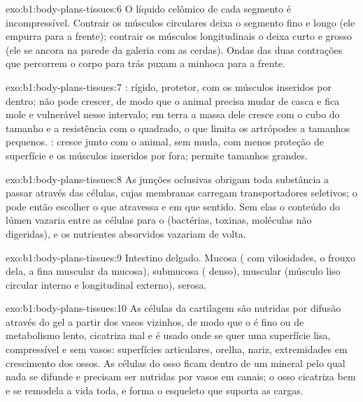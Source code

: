 \begin{solution}{exo:b1:body-plans-tissues:6}
O líquido celômico de cada segmento é incompressível. Contrair os
músculos circulares deixa o segmento fino e longo (ele empurra para a
frente); contrair os músculos longitudinais o deixa curto e grosso (ele
se ancora na parede da galeria com as cerdas). Ondas das duas contrações
que percorrem o corpo para trás puxam a minhoca para a frente.
\end{solution}

\begin{solution}{exo:b1:body-plans-tissues:7}
: rígido, protetor, com os músculos inseridos por dentro;
não pode crescer, de modo que o animal precisa mudar de casca e fica
mole e vulnerável nesse intervalo; em terra a massa dele cresce com o
cubo do tamanho e a resistência com o quadrado, o que limita os
artrópodes a tamanhos pequenos. : cresce junto com o
animal, sem muda, com menos proteção de superfície e os músculos
inseridos por fora; permite tamanhos grandes.
\end{solution}

\begin{solution}{exo:b1:body-plans-tissues:8}
As junções oclusivas obrigam toda substância a passar através das
células, cujas membranas carregam transportadores seletivos; o 
pode então escolher o que atravessa e em que sentido. Sem elas o
conteúdo do lúmen vazaria entre as células para o 
(bactérias, toxinas, moléculas não digeridas), e os nutrientes
absorvidos vazariam de volta.
\end{solution}

\begin{solution}{exo:b1:body-plans-tissues:9}
Intestino delgado. Mucosa ( com vilosidades, o 
frouxo dela, a fina muscular da mucosa), submucosa (
denso), muscular (músculo liso circular interno e longitudinal externo),
serosa.
\end{solution}

\begin{solution}{exo:b1:body-plans-tissues:10}
As células da cartilagem são nutridas por difusão através do gel a
partir dos vasos vizinhos, de modo que o  é fino ou de
metabolismo lento, cicatriza mal e é usado onde se quer uma superfície
lisa, compressível e sem vasos: superfícies articulares, orelha, nariz,
extremidades em crescimento dos ossos. As células do osso ficam dentro
de um mineral pelo qual nada se difunde e precisam ser nutridas por
vasos em canais; o osso cicatriza bem e se remodela a vida toda, e forma
o esqueleto que suporta as cargas.
\end{solution}

